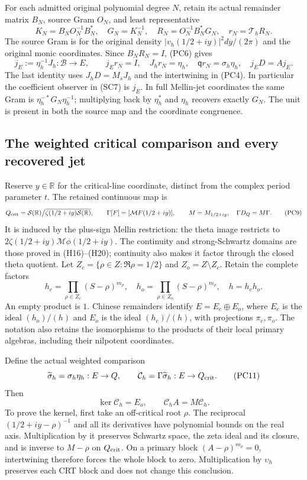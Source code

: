 For each admitted original polynomial degree $N$, retain its actual
remainder matrix $B_N$, source Gram $O_N$, and least representative
\[
 K_N=B_NO_N^{-1}B_N^*,\quad G_N=K_N^{-1},\quad
 R_N=O_N^{-1}B_N^*G_N,\quad r_N=\mathcal T_hR_N.
 \tag{PC7}
\]
The source Gram is for the original density
$|v_h(1/2+iy)|^2dy/(2\pi)$ and the original monic coordinates.
Since $B_NR_N=I$, (PC6) gives
\[
 j_E:=\eta_h^{-1}J_h:\mathscr B\to E,\qquad
 j_Er_N=I,\quad J_hr_N=\eta_h,\quad
 \mathsf q r_N=\sigma_h\eta_h,\quad j_ED=Aj_E.
 \tag{PC8}
\]
The last identity uses $J_hD=M_sJ_h$ and the intertwining in
(PC4).  In particular the coefficient observer in (SC7) is $j_E$.
In full Mellin-jet coordinates the same Gram is
$\eta_h^{-*}G_N\eta_h^{-1}$; multiplying back by $\eta_h^*$
and $\eta_h$ recovers exactly $G_N$.  The unit is present in both
the source map and the coordinate congruence.

\subsection{The weighted critical comparison and every recovered jet}

Reserve $y\in\mathbb R$ for the critical-line coordinate, distinct
from the complex period parameter $t$.  The retained continuous map is
\[
 Q_{\rm crit}=\mathcal S(\mathbb R)\big/
   \overline{\zeta(1/2+iy)\mathcal S(\mathbb R)},\qquad
 \Gamma[F]=[\mathcal MF(1/2+iy)],\qquad
 M=M_{1/2+iy},\quad \Gamma D_Q=M\Gamma.
 \tag{PC9}
\]
It is induced by the plus-sign Mellin restriction: the theta image
restricts to $2\zeta(1/2+iy)\mathcal M\phi(1/2+iy)$.
The continuity and strong-Schwartz domains are those proved in
(H16)--(H20); continuity also makes it factor through the closed
theta quotient.  Let $Z_c=\{\rho\in Z:\Re\rho=1/2\}$ and
$Z_o=Z\setminus Z_c$.  Retain the complete factors
\[
 h_c=\prod_{\rho\in Z_c}(S-\rho)^{m_\rho},\quad
 h_o=\prod_{\rho\in Z_o}(S-\rho)^{m_\rho},\quad h=h_ch_o.
 \tag{PC10}
\]
An empty product is $1$.  Chinese remainders identify
$E=E_c\oplus E_o$, where $E_c$ is the ideal $(h_o)/(h)$ and
$E_o$ is the ideal $(h_c)/(h)$, with projections $\pi_c,\pi_o$.
The notation also retains the isomorphisms to the products of their
local primary algebras, including their nilpotent coordinates.

Define the actual weighted comparison
\[
 \widetilde\sigma_h=\sigma_h\eta_h:E\to Q,\qquad
 \mathcal C_h=\Gamma\widetilde\sigma_h:E\to Q_{\rm crit}.
 \tag{PC11}
\]
Then
\[
 \boxed{\ker\mathcal C_h=E_o,\qquad
         \mathcal C_hA=M\mathcal C_h.}
 \tag{PC12}
\]
To prove the kernel, first take an off-critical root $\rho$.
The reciprocal $(1/2+iy-\rho)^{-1}$ and all its derivatives have
polynomial bounds on the real axis.  Multiplication by it preserves
Schwartz space, the zeta ideal and its closure, and is inverse to
$M-\rho$ on $Q_{\rm crit}$.  On a primary block
$(A-\rho)^{m_\rho}=0$, intertwining therefore forces the whole
block to zero.  Multiplication by $\upsilon_h$ preserves each CRT
block and does not change this conclusion.

